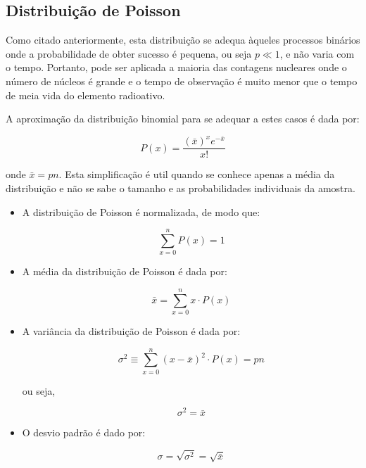 \documentclass[11pt,a4paper]{article}
\begin{document}
	\subsection{Distribuição de Poisson}

		Como citado anteriormente, esta distribuição se adequa àqueles processos binários onde a probabilidade de obter sucesso é pequena, ou seja $p \ll 1$,  e não varia com o tempo. Portanto, pode ser aplicada a maioria das contagens nucleares onde o número de núcleos é grande e o tempo de observação é muito menor que o tempo de meia vida do elemento radioativo. 

		A aproximação da distribuição binomial para se adequar a estes casos é dada por:

			\begin{equation}
				P(x) = \frac{(\bar{x})^x e^{-\bar{x}}}{x!}
			\end{equation}

		\noindent onde $\bar{x} = pn$. Esta simplificação é util quando se conhece apenas a média da distribuição e não se sabe o tamanho e as probabilidades individuais da amostra. 

		\begin{itemize}
			\item A distribuição de Poisson é normalizada, de modo que:
			
				\begin{equation}
					\sum_{x = 0}^{n} P(x) = 1
				\end{equation}

			\item A média da distribuição de Poisson é dada por:
			
				\begin{equation}
					\bar{x} = \sum_{x = 0}^{n} x \cdot P(x)
				\end{equation}

			\item A variância da distribuição de Poisson é dada por:
			
				\begin{equation}
					\sigma^2 \equiv \sum_{x = 0}^{n} (x - \bar{x})^2 \cdot P(x) = pn
				\end{equation}

				ou seja,

				\begin{equation}
					\sigma^2 = \bar{x}
				\end{equation}

			\item O desvio padrão é dado por:
			
				\begin{equation}
					\sigma = \sqrt{\sigma^2} = \sqrt{\bar{x}}
				\end{equation}

		\end{itemize}
\end{document}
